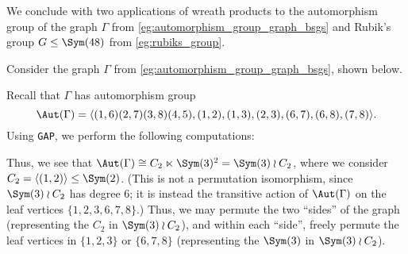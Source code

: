 We conclude with two applications of wreath products to the automorphism group of the graph $\Gamma$ from \autoref{eg:automorphism_group_graph_bsgs} and Rubik's group $G \leq \Sym(48)$ from \autoref{eg:rubiks_group}.

\begin{example}\label{eg:automorphism_group_graph_wreath}
    Consider the graph $\Gamma$ from \autoref{eg:automorphism_group_graph_bsgs}, shown below.

    \begin{center}
    \end{center}

    Recall that $\Gamma$ has automorphism group
    $$\Aut(\Gamma) = \langle (1,6)(2,7)(3,8)(4,5), (1,2), (1,3), (2,3), (6,7), (6,8), (7,8) \rangle.$$
    Using \texttt{GAP}, we perform the following computations:

    

    Thus, we see that $\Aut(\Gamma) \cong C_2 \ltimes \Sym(3)^2 = \Sym(3) \wr C_2$, where we consider $C_2 = \langle(1,2)\rangle \leq \Sym(2)$. (This is not a permutation isomorphism, since $\Sym(3) \wr C_2$ has degree 6; it is instead the transitive action of $\Aut(\Gamma)$ on the leaf vertices $\{1,2,3,6,7,8\}$.) Thus, we may permute the two ``sides'' of the graph (representing the $C_2$ in $\Sym(3) \wr C_2$), and within each ``side'', freely permute the leaf vertices in $\{1,2,3\}$ or $\{6,7,8\}$ (representing the $\Sym(3)$ in $\Sym(3) \wr C_2$).
\end{example}


